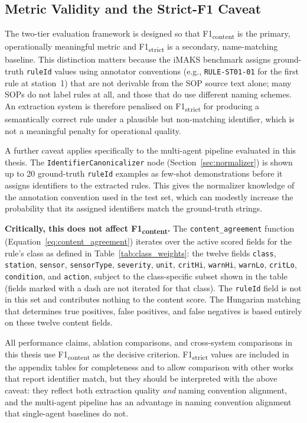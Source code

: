 ﻿\documentclass[11pt]{article}
\begin{document}
\subsection{Metric Validity and the Strict-F1 Caveat}
\label{sec:metric_validity}

The two-tier evaluation framework is designed so that F1\textsubscript{content}
is the primary, operationally meaningful metric and F1\textsubscript{strict} is
a secondary, name-matching baseline.
This distinction matters because the iMAKS benchmark assigns ground-truth
\texttt{ruleId} values using annotator conventions (e.g., \texttt{RULE-ST01-01}
for the first rule at station~1) that are not derivable from the SOP source text
alone; many SOPs do not label rules at all, and those that do use different
naming schemes.
An extraction system is therefore penalised on F1\textsubscript{strict} for
producing a semantically correct rule under a plausible but non-matching
identifier, which is not a meaningful penalty for operational quality.

A further caveat applies specifically to the multi-agent pipeline evaluated in
this thesis.
The \texttt{IdentifierCanonicalizer} node (Section~\ref{sec:normalizer}) is
shown up to 20 ground-truth \texttt{ruleId} examples as few-shot demonstrations
before it assigns identifiers to the extracted rules.
This gives the normalizer knowledge of the annotation convention used in the test
set, which can modestly increase the probability that its assigned identifiers
match the ground-truth strings.

\textbf{Critically, this does not affect F1\textsubscript{content}.}
The \texttt{content\_agreement} function (Equation~\ref{eq:content_agreement})
iterates over the active scored fields for the rule's class as defined in
Table~\ref{tab:class_weights}: the twelve fields
\texttt{class}, \texttt{station}, \texttt{sensor}, \texttt{sensorType},
\texttt{severity}, \texttt{unit}, \texttt{critHi}, \texttt{warnHi},
\texttt{warnLo}, \texttt{critLo}, \texttt{condition}, and \texttt{action},
subject to the class-specific subset shown in the table (fields marked with a
dash are not iterated for that class).
The \texttt{ruleId} field is not in this set and contributes nothing to the
content score.
The Hungarian matching that determines true positives, false positives, and
false negatives is based entirely on these twelve content fields.

All performance claims, ablation comparisons, and cross-system comparisons in
this thesis use F1\textsubscript{content} as the decisive criterion.
F1\textsubscript{strict} values are included in the appendix tables for
completeness and to allow comparison with other works that report identifier
match, but they should be interpreted with the above caveat: they reflect both
extraction quality \emph{and} naming convention alignment, and the multi-agent
pipeline has an advantage in naming convention alignment that single-agent
baselines do not.
\end{document}
